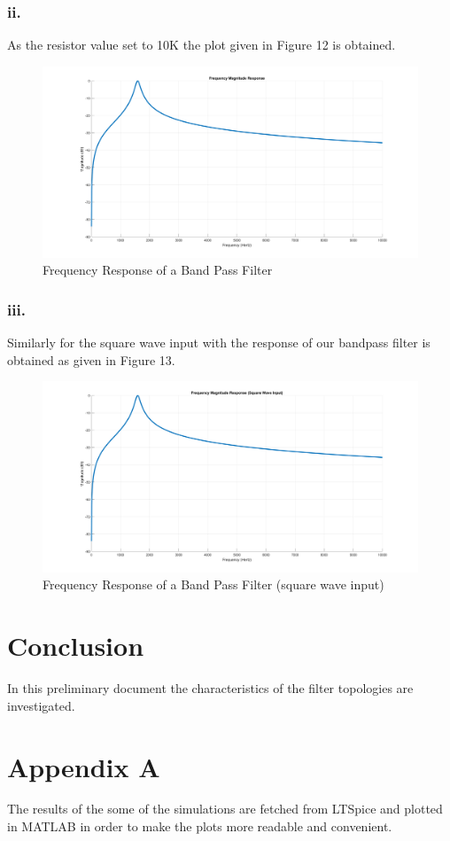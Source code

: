 \documentclass[letterpaper,12pt]{article}
\begin{document}
\subsubsection{ii.}
As the resistor value set to 10K the plot given in Figure 12 is obtained.
\begin{figure}[H]
    \centering
    \includegraphics[width=1\textwidth]{6_3_2.png}
    \caption{Frequency Response of a Band Pass Filter}
\end{figure} 
\subsubsection{iii.}
Similarly for the square wave input with the response of our bandpass filter is obtained as given in Figure 13.
\begin{figure}[H]
    \centering
    \includegraphics[width=1\textwidth]{6_3_3.png}
    \caption{Frequency Response of a Band Pass Filter (square wave input)}
\end{figure} 

\section{Conclusion}
In this preliminary document the characteristics of the filter topologies are investigated.
\section*{Appendix A}
The results of the some of the simulations are fetched from LTSpice and plotted in MATLAB in order to make the plots more readable and convenient.
\end{document}
